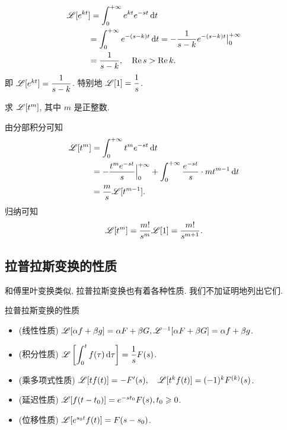 \begin{solution}
	\begin{align*}
		\mathscr{L}[e^{kt}]&=\int_0^{+\infty}e^{kt}e^{-st}\,\mathrm{d} t\\
		&{=\int_0^{+\infty}e^{-(s-k)t}\,\mathrm{d} t
		=-\frac1{s-k}e^{-(s-k)t}\big|_0^{+\infty}}\\
		&{=\frac1{s-k}, \quad\operatorname{Re} s>\operatorname{Re} k.}
	\end{align*}
	即 \emph{$\mathscr{L}[e^{kt}]=\dfrac1{s-k}$}.
	特别地 \emph{$\mathscr{L}[1]=\dfrac1s$}.
\end{solution}

\begin{example}
	求 $\mathscr{L}[t^m]$, 其中 $m$ 是正整数.
\end{example}

\begin{solution}
	由分部积分可知
	\begin{align*}
		\mathscr{L}[t^m]&=\int_0^{+\infty}t^me^{-st}\,\mathrm{d} t\\
		&=-\frac{t^me^{-st}}s\Big|_0^{+\infty}+\int_0^{+\infty}\frac{e^{-st}}s\cdot mt^{m-1}\,\mathrm{d} t\\
		&=\frac ms\mathscr{L}[t^{m-1}].
	\end{align*}
	归纳可知
		\[\mathscr{L}[t^m]=\frac{m!}{s^m}\mathscr{L}[1]=\frac{m!}{s^{m+1}}.\]
\end{solution}

\subsection{拉普拉斯变换的性质}

和傅里叶变换类似, 拉普拉斯变换也有着各种性质. 我们不加证明地列出它们.

\begin{theorem}{拉普拉斯变换的性质}
	\begin{itemize}
		\item (线性性质) $\mathscr{L}[\alpha f+\beta g]=\alpha F+\beta G, \mathscr{L}^{-1}[\alpha F+\beta G]=\alpha f+\beta g$.
		\item (积分性质) $\displaystyle\mathscr{L}\left[\int_0^t f(\tau)\,\mathrm{d}\tau\right]=\frac 1s F(s)$.
		\item (乘多项式性质) $\mathscr{L}[tf(t)]=-F'(s),\quad\mathscr{L}[t^kf(t)]=(-1)^kF^{(k)}(s)$.
		\item (延迟性质) $\mathscr{L}[f(t-t_0)]=e^{-st_0}F(s), t_0\geqslant 0$.
		\item (位移性质) $\mathscr{L}[e^{s_0t}f(t)]=F(s-s_0)$.
	\end{itemize}
\end{theorem}

